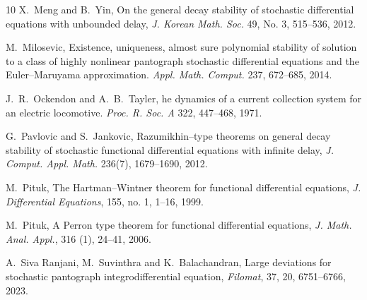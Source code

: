 \documentclass[a4paper,10pt,reqno]{amsart}
\numberwithin{equation}{section}
\theoremstyle{definition}
\theoremstyle{remark}
\DeclareMathOperator{\1}{\mathbbm 1}
\begin{document}
\begin{thebibliography}{10}
X.~Meng and B.~Yin, On the general decay stability of stochastic differential equations with unbounded delay, {\em J. Korean Math. Soc.} 49, No. 3, 515--536, 2012. 

M.~Milosevic, Existence, uniqueness, almost sure polynomial stability of solution to a class of highly
nonlinear pantograph stochastic differential equations and the Euler--Maruyama approximation. {\em Appl.
	Math. Comput.} 237, 672--685, 2014.

J.~R.~Ockendon and A.~B.~Tayler, he dynamics of a current collection system for an electric locomotive. {\em Proc. R. Soc. A} 322, 447--468, 1971.

G.~Pavlovic and S.~Jankovic, Razumikhin--type theorems on general decay stability of stochastic
functional differential equations with infinite delay, {\em J. Comput. Appl. Math.} 236(7), 1679--1690, 2012.

M.~Pituk, The Hartman--Wintner theorem for functional differential equations, {\em J. Differential
	Equations}, 155, no. 1, 1--16, 1999. 

M.~Pituk, A Perron type theorem for functional differential equations, {\em J. Math. Anal. Appl.}, 316 (1), 24--41, 2006.

A.~Siva Ranjani, M.~Suvinthra and K.~Balachandran, Large deviations for stochastic pantograph integrodifferential equation, {\em Filomat}, 37, 20, 6751--6766, 2023.




\end{thebibliography}
\end{document}
